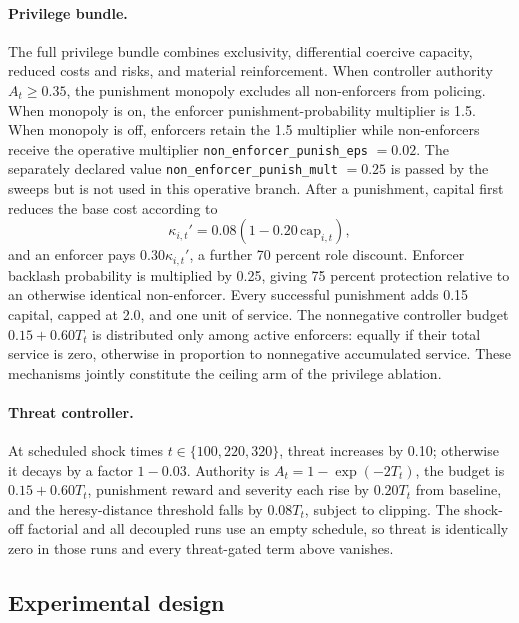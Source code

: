 \documentclass[12pt]{article}
\begin{document}
\paragraph{Privilege bundle.} The full privilege bundle combines exclusivity,
differential coercive capacity, reduced costs and risks, and material
reinforcement. When controller authority \(A_t\geq0.35\), the punishment monopoly
excludes all non-enforcers from policing. When monopoly is on, the enforcer
punishment-probability multiplier is 1.5. When monopoly is off, enforcers retain
the 1.5 multiplier while non-enforcers receive the operative multiplier
\texttt{non\_enforcer\_punish\_eps} \(=0.02\). The separately declared value
\texttt{non\_enforcer\_punish\_mult} \(=0.25\) is passed by the sweeps but is not
used in this operative branch. After a punishment, capital first reduces the base
cost according to
\begin{equation}
 \kappa_{i,t}'=0.08\left(1-0.20\,\mathrm{cap}_{i,t}\right),
\end{equation}
and an enforcer pays \(0.30\kappa_{i,t}'\), a further 70 percent role discount.
Enforcer backlash probability is multiplied by 0.25, giving 75 percent protection
relative to an otherwise identical non-enforcer. Every successful punishment adds
0.15 capital, capped at 2.0, and one unit of service. The nonnegative controller
budget \(0.15+0.60T_t\) is distributed only among active enforcers: equally if
their total service is zero, otherwise in proportion to nonnegative accumulated
service. These mechanisms jointly constitute the ceiling arm of the privilege
ablation.

\paragraph{Threat controller.} At scheduled shock times \(t\in\{100,220,320\}\),
threat increases by 0.10; otherwise it decays by a factor \(1-0.03\). Authority
is \(A_t=1-\exp(-2T_t)\), the budget is \(0.15+0.60T_t\), punishment reward and
severity each rise by \(0.20T_t\) from baseline, and the heresy-distance
threshold falls by \(0.08T_t\), subject to clipping. The shock-off factorial and
all decoupled runs use an empty schedule, so threat is identically zero in those
runs and every threat-gated term above vanishes.

\subsection{Experimental design}
\end{document}
